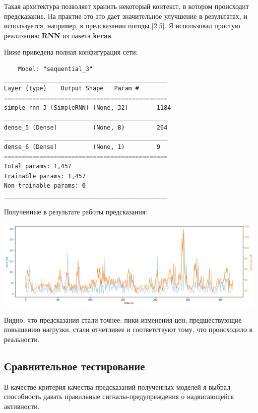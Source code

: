 Такая архитектура позволяет хранить некоторый контекст, в котором происходит предсказание. На практие это это дает значительное улучшение в результатах, и используется, например, в предсказании погоды [2.5].
\newpage
Я использовал простую реализацию \textbf{RNN} из пакета \textbf{keras}.

Ниже приведена полная конфигурация сети:
\begin{small}
\begin{verbatim}
    Model: "sequential_3"
______________________________________________
Layer (type)    Output Shape   Param #   
==============================================
simple_rnn_3 (SimpleRNN) (None, 32)        1184      
______________________________________________
dense_5 (Dense)          (None, 8)         264       
______________________________________________
dense_6 (Dense)          (None, 1)         9         
==============================================
Total params: 1,457
Trainable params: 1,457
Non-trainable params: 0
______________________________________________
\end{verbatim}
\end{small}

Полученные в результате работы предсказания:

\begin{center}
    \includegraphics[width=450pt]{images/graph_rnn_prediction.png}
\end{center}

Видно, что предсказания стали точнее: пики изменения цен, предшествующие повышению нагрузки, стали отчетливее и соответствуют тому, что происходило в реальности.
\newpage

\subsection{Сравнительное тестирование}

В качестве критерия качества предсказаний полученных моделей я выбрал способность давать правильные сигналы-предупреждения о надвигающейся активности.

